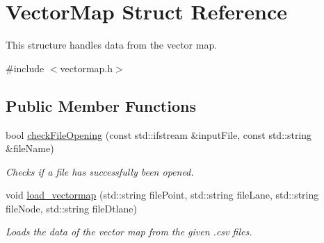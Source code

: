 \hypertarget{structVectorMap}{}\section{Vector\+Map Struct Reference}
\label{structVectorMap}


This structure handles data from the vector map.  




{\ttfamily \#include $<$vectormap.\+h$>$}

\subsection*{Public Member Functions}
\begin{DoxyCompactItemize}
\item 
bool \hyperlink{structVectorMap_ae5a2399e6c9fb052c26ca170d211fa32}{check\+File\+Opening} (const std\+::ifstream \&input\+File, const std\+::string \&file\+Name)
\begin{DoxyCompactList}\small\item\em Checks if a file has successfully been opened. \end{DoxyCompactList}\item 
void \hyperlink{structVectorMap_a0f3bd8f62ce45cdbeeeefb8bed9048d0}{load\+\_\+vectormap} (std\+::string file\+Point, std\+::string file\+Lane, std\+::string file\+Node, std\+::string file\+Dtlane)
\begin{DoxyCompactList}\small\item\em Loads the data of the vector map from the given .csv files. \end{DoxyCompactList}\end{DoxyCompactItemize}
